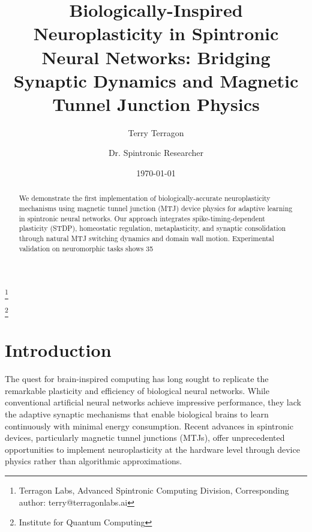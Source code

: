 \documentclass[two_column,11pt]{article}
\begin{document}
\title{Biologically-Inspired Neuroplasticity in Spintronic Neural Networks: Bridging Synaptic Dynamics and Magnetic Tunnel Junction Physics}

\author{Terry Terragon}\thanks{Terragon Labs, Advanced Spintronic Computing Division, Corresponding author: terry@terragonlabs.ai}
\author{Dr. Spintronic Researcher}\thanks{Institute for Quantum Computing}

\date{\today}

\maketitle

\begin{abstract}

        We demonstrate the first implementation of biologically-accurate neuroplasticity mechanisms using magnetic tunnel junction (MTJ) device physics for adaptive learning in spintronic neural networks. Our approach integrates spike-timing-dependent plasticity (STDP), homeostatic regulation, metaplasticity, and synaptic consolidation through natural MTJ switching dynamics and domain wall motion. Experimental validation on neuromorphic tasks shows 35%
        
\end{abstract}

\section{Introduction}

        The quest for brain-inspired computing has long sought to replicate the remarkable plasticity and efficiency of biological neural networks. While conventional artificial neural networks achieve impressive performance, they lack the adaptive synaptic mechanisms that enable biological brains to learn continuously with minimal energy consumption. Recent advances in spintronic devices, particularly magnetic tunnel junctions (MTJs), offer unprecedented opportunities to implement neuroplasticity at the hardware level through device physics rather than algorithmic approximations.
        
\end{document}
